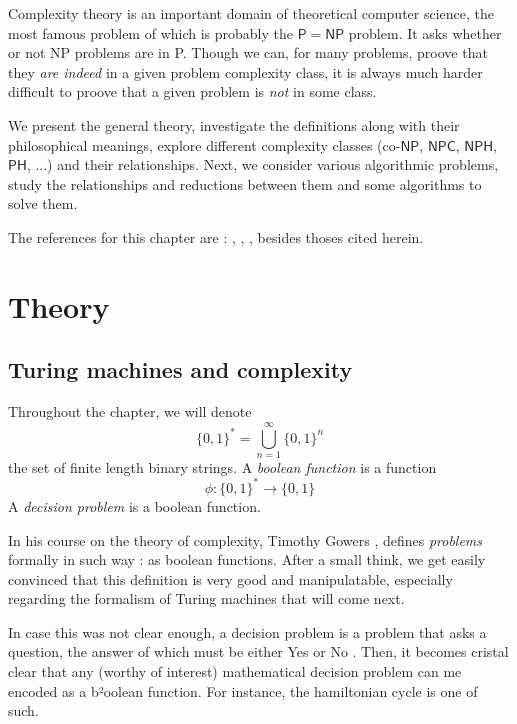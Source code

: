 Complexity theory is an important domain of theoretical computer science, the most famous problem of which is probably the \og $ \mathsf P = \mathsf{NP} $ \fg problem. It asks whether or not NP problems are in P. Though we can, for many problems, proove that they \textit{are indeed} in a given problem complexity class, it is always much harder difficult to proove that a given problem is \textit{not} in some class.

We present the general theory, investigate the definitions along with their philosophical meanings, explore different complexity classes (co-$ \mathsf{NP} $, $ \mathsf{NPC} $, $ \mathsf{NPH} $, $ \mathsf{PH} $, ...) and their relationships. Next, we consider various algorithmic problems, study the relationships and reductions between them and some algorithms to solve them.

The references for this chapter are : \cite{gowers2023}, \cite{gowers2024}, \cite{hudry2024}, besides thoses cited herein.

\section{Theory}

\subsection{Turing machines and complexity}

\begin{definition}
    Throughout the chapter, we will denote
    \[
    \{0,1\}^* = \bigcup_{n=1}^\infty \{0,1\}^n
    \]
    the set of finite length binary strings.
    A \textit{boolean function} is a function
    \[
    \phi : \{0,1\}^* \to \{0,1\}
    \]
    A \textit{decision problem} is a boolean function.
\end{definition}

In his course on the theory of complexity, Timothy Gowers \cite{gowers2023}, \cite{gowers2024} defines \textit{problems} formally in such way : as boolean functions. After a small think, we get easily convinced that this definition is very good and manipulatable, especially regarding the formalism of Turing machines that will come next.

In case this was not clear enough, a decision problem is a problem that asks a question, the answer of which must be either \og Yes \fg or \og No \fg. Then, it becomes cristal clear that any (worthy of interest) mathematical decision problem can me encoded as a b²oolean function. For instance, the hamiltonian cycle is one of such.

